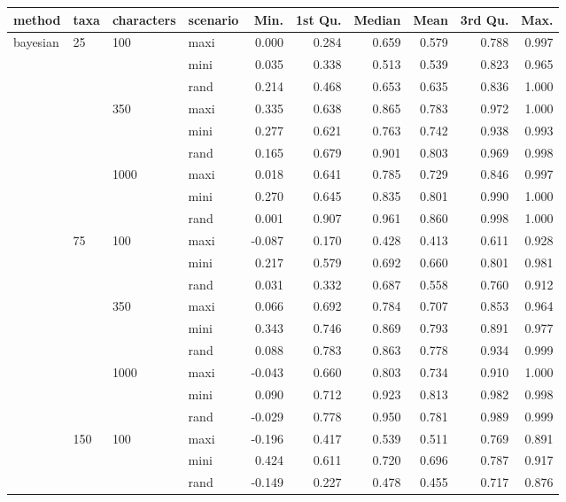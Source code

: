 \begin{table}[ht]
\centering
\begin{tabular}{llllrrrrrr}
  \hline
method & taxa & characters & scenario & Min. & 1st Qu. & Median & Mean & 3rd Qu. & Max. \\ 
  \hline
bayesian & 25 & 100 & maxi & 0.000 & 0.284 & 0.659 & 0.579 & 0.788 & 0.997 \\ 
   &  &  & mini & 0.035 & 0.338 & 0.513 & 0.539 & 0.823 & 0.965 \\ 
   &  &  & rand & 0.214 & 0.468 & 0.653 & 0.635 & 0.836 & 1.000 \\ 
   &  & 350 & maxi & 0.335 & 0.638 & 0.865 & 0.783 & 0.972 & 1.000 \\ 
   &  &  & mini & 0.277 & 0.621 & 0.763 & 0.742 & 0.938 & 0.993 \\ 
   &  &  & rand & 0.165 & 0.679 & 0.901 & 0.803 & 0.969 & 0.998 \\ 
   &  & 1000 & maxi & 0.018 & 0.641 & 0.785 & 0.729 & 0.846 & 0.997 \\ 
   &  &  & mini & 0.270 & 0.645 & 0.835 & 0.801 & 0.990 & 1.000 \\ 
   &  &  & rand & 0.001 & 0.907 & 0.961 & 0.860 & 0.998 & 1.000 \\ 
   & 75 & 100 & maxi & -0.087 & 0.170 & 0.428 & 0.413 & 0.611 & 0.928 \\ 
   &  &  & mini & 0.217 & 0.579 & 0.692 & 0.660 & 0.801 & 0.981 \\ 
   &  &  & rand & 0.031 & 0.332 & 0.687 & 0.558 & 0.760 & 0.912 \\ 
   &  & 350 & maxi & 0.066 & 0.692 & 0.784 & 0.707 & 0.853 & 0.964 \\ 
   &  &  & mini & 0.343 & 0.746 & 0.869 & 0.793 & 0.891 & 0.977 \\ 
   &  &  & rand & 0.088 & 0.783 & 0.863 & 0.778 & 0.934 & 0.999 \\ 
   &  & 1000 & maxi & -0.043 & 0.660 & 0.803 & 0.734 & 0.910 & 1.000 \\ 
   &  &  & mini & 0.090 & 0.712 & 0.923 & 0.813 & 0.982 & 0.998 \\ 
   &  &  & rand & -0.029 & 0.778 & 0.950 & 0.781 & 0.989 & 0.999 \\ 
   & 150 & 100 & maxi & -0.196 & 0.417 & 0.539 & 0.511 & 0.769 & 0.891 \\ 
   &  &  & mini & 0.424 & 0.611 & 0.720 & 0.696 & 0.787 & 0.917 \\ 
   &  &  & rand & -0.149 & 0.227 & 0.478 & 0.455 & 0.717 & 0.876 \\ 

\end{tabular}
\end{table}
